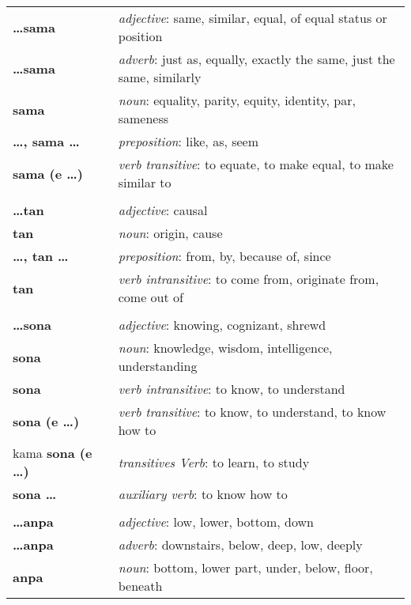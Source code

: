 \begin{supertabular}{p{2,5cm}|ll}
\textbf{\dots sama} && \textit{adjective}: same, similar, equal, of equal status or position \\ %
\textbf{\dots sama} && \textit{adverb}: just as, equally, exactly the same, just the same, similarly \\ %
\textbf{sama} && \textit{noun}: equality, parity, equity, identity, par, sameness \\ %
\textbf{\dots , sama \dots} && \textit{preposition}: like, as, seem \\ %
\textbf{sama (e \dots)} && \textit{verb transitive}: to equate, to make equal, to make similar to \\ %
 && \\ %
\textbf{\dots tan} && \textit{adjective}: causal \\ %
\textbf{tan} && \textit{noun}: origin, cause \\ %
\textbf{\dots , tan \dots} && \textit{preposition}: from, by, because of, since \\ %
\textbf{tan} && \textit{verb intransitive}: to come from, originate from, come out of \\ %
 && \\ %
\textbf{\dots sona} && \textit{adjective}: knowing, cognizant, shrewd \\ %
\textbf{sona} && \textit{noun}: knowledge, wisdom, intelligence, understanding \\ %
\textbf{sona} && \textit{verb intransitive}: to know, to understand \\ %
\textbf{sona (e \dots)} && \textit{verb transitive}: to know, to understand, to know how to \\ %
kama \textbf{sona (e \dots)} && \textit{transitives Verb}: to learn, to study \\ %
\textbf{sona \dots} && \textit{auxiliary verb}: to know how to \\ %
 && \\ %
\textbf{\dots anpa} && \textit{adjective}: low, lower, bottom, down \\ %
\textbf{\dots anpa} && \textit{adverb}: downstairs, below, deep, low, deeply \\ %
\textbf{anpa} && \textit{noun}: bottom, lower part, under, below, floor, beneath \\ %

\end{supertabular}

